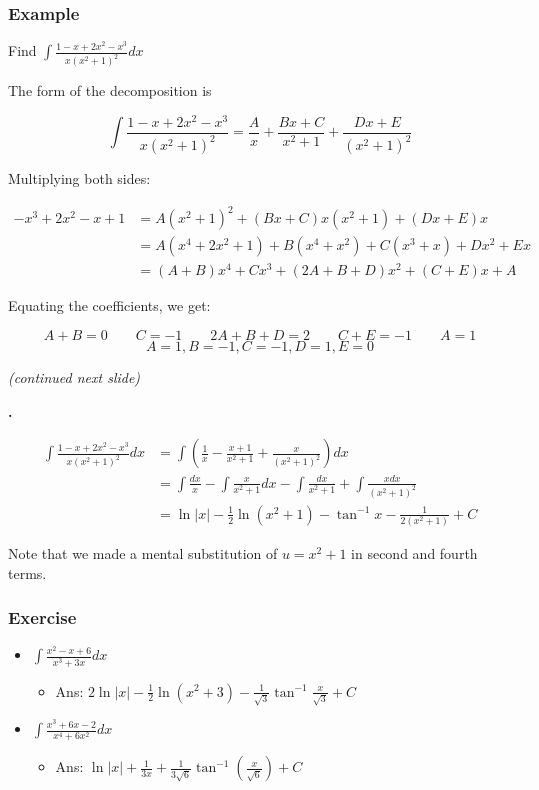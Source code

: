 \documentclass[t]{beamer}
\theoremstyle{plain}
\theoremstyle{definition}
\newcounter{heading}
\newcommand{\newhead}[1]{\medskip\stepcounter{heading}\noindent\textbf{\hspace{0.2cm}{#1}.}}
\begin{document}
\begin{frame}
\footnotesize
\frametitle{Example}
Find $\displaystyle\int\frac{1 - x + 2x^2 - x^3}{x(x^2 + 1)^2}dx$\pause

\medskip

The form of the decomposition is

$$\displaystyle\int\frac{1 - x + 2x^2 - x^3}{x(x^2 + 1)^2} = \frac{A}{x} + \frac{Bx + C}{x^2 + 1} + \frac{Dx + E}{(x^2 + 1)^2}$$

Multiplying both sides:

\begin{align*}
-x^3 + 2x^2 - x + 1 &= A(x^2 + 1)^2 + (Bx + C)x(x^2 + 1) + (Dx + E)x\\
&= A(x^4 + 2x^2 + 1) + B(x^4 + x^2) + C(x^3 + x) + Dx^2 + Ex\\
&= (A + B)x^4 + Cx^3 + (2A + B + D)x^2 + (C + E)x + A
\end{align*}

Equating the coefficients, we get:

$$A + B = 0 \qquad C = -1 \qquad 2A + B + D = 2 \qquad C + E = -1 \qquad A = 1$$
$$ A =1, B = -1, C = -1, D = 1, E = 0$$

\textit{(continued next slide)}

\end{frame}

\begin{frame}
\footnotesize
\newhead{Continued...}

\begin{align*}
\displaystyle\int\frac{1 - x + 2x^2 - x^3}{x(x^2 + 1)^2}dx &= \int\left(\frac{1}{x} - \frac{x + 1}{x^2 + 1} + \frac{x}{(x^2 + 1)^2}\right)dx\\
&= \int\frac{dx}{x} - \int\frac{x}{x^2 + 1}dx - \int\frac{dx}{x^2 + 1} + \int\frac{xdx}{(x^2 + 1)^2}\\
&= \ln|x| - \frac{1}{2}\ln(x^2 + 1) - \tan^{-1}x - \frac{1}{2(x^2 + 1)} + C
\end{align*}

Note that we made a mental substitution of $u = x^2 + 1$ in second and fourth terms.

\end{frame}

\begin{frame}
\frametitle{Exercise}
\begin{itemize}
	\item  $\displaystyle\int\frac{x^2 - x + 6}{x^3 + 3x}dx$%
	\begin{itemize}
		\item Ans: $2\ln|x| - \frac{1}{2}\ln(x^2 + 3) - \frac{1}{\sqrt{3}}\tan^{-1}\frac{x}{\sqrt{3}} + C$
	\end{itemize}
	\item  $\displaystyle\int\frac{x^3 + 6x - 2}{x^4 + 6x^2}dx$%
	\begin{itemize}
		\item Ans: $\ln|x| + \frac{1}{3x} + \frac{1}{3\sqrt{6}}\tan^{-1}\left(\frac{x}{\sqrt{6}}\right) + C$
	\end{itemize}
\end{itemize}

\end{frame}
\end{document}
